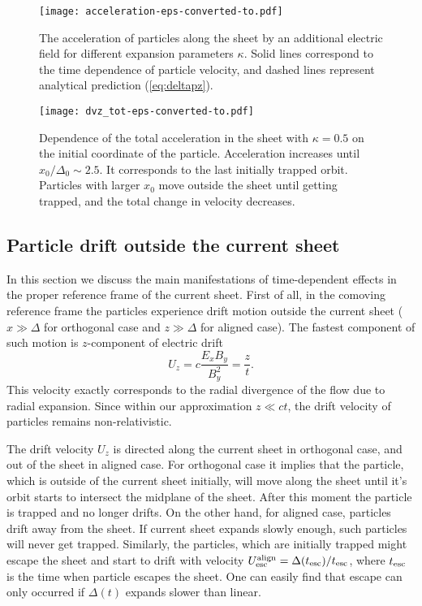 \documentclass[useAMS,usenatbib]{mn2e}
\begin{document}
\begin{figure}
\centering
\texttt{[image: acceleration-eps-converted-to.pdf]}
\caption{The acceleration of particles along the sheet by an additional electric 
field for different expansion parameters $\kappa$. Solid lines correspond to the 
time dependence of particle velocity, and dashed lines represent analytical prediction 
(\ref{eq:deltapz}).}
\label{fig:p(t)}
\end{figure}
\begin{figure}
\centering
\texttt{[image: dvz\_tot-eps-converted-to.pdf]}
\caption{Dependence of the total acceleration in the sheet with $\kappa = 0.5$ on the 
initial coordinate of the particle. Acceleration increases until $x_0/\Delta_0\sim 2.5$. 
It corresponds to the last initially trapped orbit. Particles with larger $x_0$ move 
outside the sheet until getting trapped, and the total change in velocity decreases.}
\label{fig:p(x)}
\end{figure}

\subsection{Particle drift outside the current sheet}
  \label{part.drift}

{ In this section we discuss the main manifestations of time-dependent
effects in the proper reference frame of the current sheet. First of all,} in the 
comoving reference frame the particles experience drift motion outside the current 
sheet ($x \gg \Delta$ for orthogonal case and $z \gg \Delta$ for aligned case). The 
fastest component of such motion is $z$-component of electric drift 
\begin{equation}
\label{eqn.drift.vel.}
    U_z = c\frac{E_x B_y}{B_y^2} = \frac{z}{t}.
\end{equation}
This velocity exactly corresponds to the radial divergence of the flow due to 
radial expansion. Since within our approximation $z \ll ct $, the drift velocity 
of particles remains non-relativistic.

The drift velocity $U_z$ is directed along the current sheet in orthogonal case, 
and out of the sheet in aligned case. For orthogonal case it implies that the 
particle, which is outside of the current sheet initially, will move along the 
sheet until it's orbit starts to intersect the midplane of the sheet. After 
this moment the particle is trapped and no longer drifts. On the other hand, 
for aligned case, particles drift away from the sheet. If current sheet expands 
slowly enough, such particles will never get trapped. Similarly, the particles, 
which are initially trapped might escape the sheet and start to drift with 
velocity $U_{\rm esc}^{\rm align} = \Delta(t_{\rm esc})/t_{\rm esc}$, where 
$t_{\rm esc}$ is the time when particle escapes the sheet. One can easily find 
that escape can only occurred if $\Delta(t)$ expands slower than linear.
\end{document}
